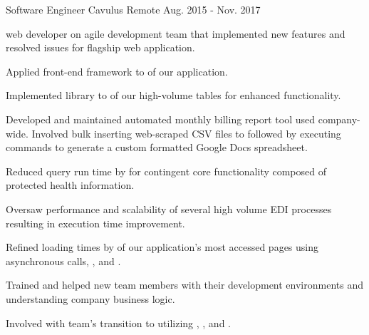 

\begin{cventries}

  \cventry
    {Software Engineer} %
    {Cavulus} %
    {Remote} %
    {Aug. 2015 - Nov. 2017} %
    {
      \begin{cvitems} %
        \item { web developer on agile development team that implemented new features and resolved issues for flagship web application.}
        \item {Applied front-end framework  to  of our application.}
        \item {Implemented  library  to  of our high-volume tables for enhanced functionality.}
        \item {Developed and maintained automated monthly billing report tool used company-wide. Involved bulk inserting web-scraped CSV files to  followed by executing  commands to generate a custom formatted Google Docs spreadsheet.}
        \item {Reduced  query run time by  for  contingent core functionality composed of protected health information.}
        \item {Oversaw performance and scalability of several high volume EDI processes resulting in  execution time improvement.}
        \item {Refined loading times by  of our application’s most accessed pages using asynchronous  calls, , and .}
        \item {Trained and helped new team members with their development environments and understanding company business logic.}
        \item {Involved with team's transition to utilizing , , and .}
      \end{cvitems}
    }


\end{cventries}
